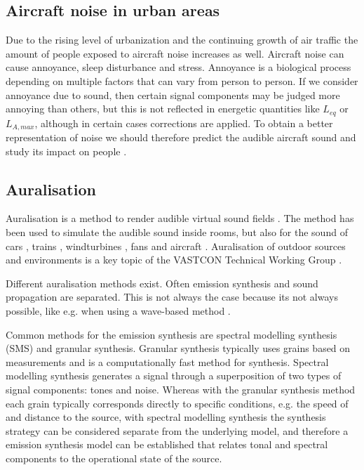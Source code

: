 \documentclass[10pt,twocolumn]{article}
\begin{document}
\subsection{Aircraft noise in urban areas}
Due to the rising level of urbanization and the continuing growth of air traffic
the amount of people exposed to aircraft noise increases as well. Aircraft noise
can cause annoyance, sleep disturbance and stress. Annoyance is a biological
process depending on multiple factors that can vary from person to person. If we
consider annoyance due to sound, then certain signal components may be judged
more annoying than others, but this is not reflected in energetic quantities
like $L_{eq}$ or $L_{A,max}$, although in certain cases corrections are applied. To
obtain a better representation of noise we should therefore predict the audible
aircraft sound and study its impact on people \cite{Arntzen2011}.

\subsection{Auralisation}
Auralisation is a method to render audible virtual sound fields \cite{Kleiner1993}.
The method has been used to simulate the audible sound inside
rooms, but also for the sound of
cars \cite{Forssen2009,Maillard2012,Pieren2015,Hoffmann2016,Hoffmann2016a},
trains \cite{Pieren2016},
windturbines \cite{Pieren2014,Heutschi2014},
fans \cite{Merino2016} and
aircraft \cite{Arntzen2014a, Rizzi2016a, Rizzi2016}. Auralisation of outdoor sources
and environments is a key topic of the VASTCON Technical Working Group \cite{Vastcon}.


Different auralisation methods exist. Often emission synthesis and sound
propagation are separated. This is not always the case because its not always
possible, like e.g. when using a wave-based method
\cite{Hornikx2016,Georgiou2016,Georgiou2016a}.

Common methods for the emission synthesis are spectral modelling synthesis (SMS)
and granular synthesis. Granular synthesis typically uses grains based on
measurements and is a computationally fast method for synthesis. Spectral
modelling synthesis generates a signal through a superposition of two types of
signal components: tones and noise. Whereas with the granular synthesis method
each grain typically corresponds directly to specific conditions, e.g. the speed
of and distance to the source, with spectral modelling synthesis the synthesis
strategy can be considered separate from the underlying model, and therefore a
emission synthesis model can be established that relates tonal and spectral
components to the operational state of the source.
\end{document}
